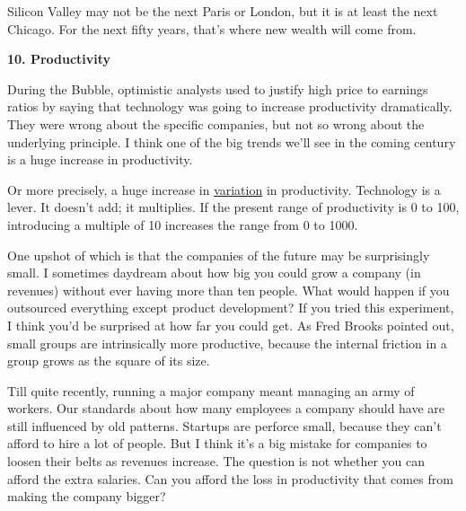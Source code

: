 Silicon Valley may not be the
                  next Paris or London, but it is at least the next Chicago. For
                  the next fifty years, that's where new wealth will come
                  from.

\textbf{10. Productivity}

During the
                  Bubble, optimistic analysts used to justify high price to
                  earnings ratios by saying that technology was going to
                  increase productivity dramatically. They were wrong about the
                  specific companies, but not so wrong about the underlying
                  principle. I think one of the big trends we'll see in the
                  coming century is a huge increase in productivity.

Or
                  more precisely, a huge increase in
                  \href{http://www.paulgraham.com/gh.html}{variation} in productivity. Technology is
                  a lever. It doesn't add; it multiplies. If the present range
                  of productivity is 0 to 100, introducing a multiple of 10
                  increases the range from 0 to 1000.

One upshot of
                  which is that the companies of the future may be surprisingly
                  small. I sometimes daydream about how big you could grow a
                  company (in revenues) without ever having more than ten
                  people. What would happen if you outsourced everything except
                  product development? If you tried this experiment, I think
                  you'd be surprised at how far you could get. As Fred Brooks
                  pointed out, small groups are intrinsically more productive,
                  because the internal friction in a group grows as the square
                  of its size.

Till quite recently, running a major
                  company meant managing an army of workers. Our standards about
                  how many employees a company should have are still influenced
                  by old patterns. Startups are perforce small, because they
                  can't afford to hire a lot of people. But I think it's a big
                  mistake for companies to loosen their belts as revenues
                  increase. The question is not whether you can afford the extra
                  salaries. Can you afford the loss in productivity that comes
                  from making the company bigger?

